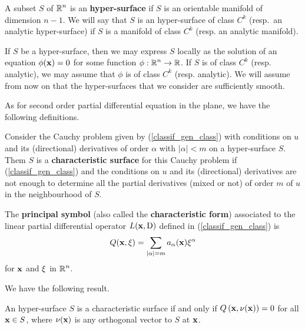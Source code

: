 \begin{defn}
A subset $S$ of $\displaystyle \mathbb{R}^n$ is an
{\bfseries hyper-surface} 
if $S$ is an orientable manifold of dimension $n-1$.  We will say that
$S$ is an hyper-surface of class $\displaystyle C^k$ (resp.\ an analytic
hyper-surface) if $S$ is a manifold of class $\displaystyle C^k$
(resp. an analytic manifold).
\end{defn}

If $S$ be a hyper-surface, then we may express $S$ locally as the
solution of an equation $\phi(\mathbf{x}) = 0$ for some function
$\displaystyle \phi:\mathbb{R}^n \to \mathbb{R}$.  If $S$ is of class
$\displaystyle C^k$ (resp. analytic), we may assume that
$\phi$ is of class $\displaystyle C^k$ (resp. analytic).  We will
assume from now on that the hyper-surfaces that we consider are
sufficiently smooth.

As for second order partial differential equation in the plane, we
have the following definitions.

\begin{defn} \label{char_surf_hd_def}
Consider the Cauchy problem given by (\ref{classif_gen_class}) with
conditions on $u$ and its (directional) derivatives of order $\alpha$
with $|\alpha|<m$ on a hyper-surface $S$.  Them $S$ is a
{\bfseries characteristic surface}
for this Cauchy problem if (\ref{classif_gen_class}) and the
conditions on $u$ and its (directional) derivatives are not
enough to determine all the partial derivatives (mixed or not) of
order $m$ of $u$ in the neighbourhood of $S$.
\end{defn}

\begin{defn}
The {\bfseries principal symbol} (also called the
{\bfseries characteristic form})
associated to the linear partial differential operator
$\displaystyle L(\mathbf{x}, \operatorname{D})$ defined in
(\ref{classif_gen_class}) is
\begin{equation} \label{classif_gen_princ_symb}
Q(\mathbf{x}, \mathbf{\xi}) = \sum_{|\alpha|=m} a_\alpha(\mathbf{x}) \mathbf{\xi}^\alpha
\end{equation}
for $\mathbf{x}$ and $\mathbf{\xi}$ in $\displaystyle \mathbb{R}^n$.
\end{defn}

We have the following result.

\begin{prop}
An hyper-surface $S$ is a characteristic surface if and only if
$\displaystyle Q\left(\mathbf{x}, \mathbf{\nu}(\mathbf{x}) \right) = 0$ for all
$\mathbf{x} \in S$,
where $\displaystyle \mathbf{\nu}(\mathbf{x})$ is any orthogonal vector to $S$
at $\mathbf{x}$.
\end{prop}

